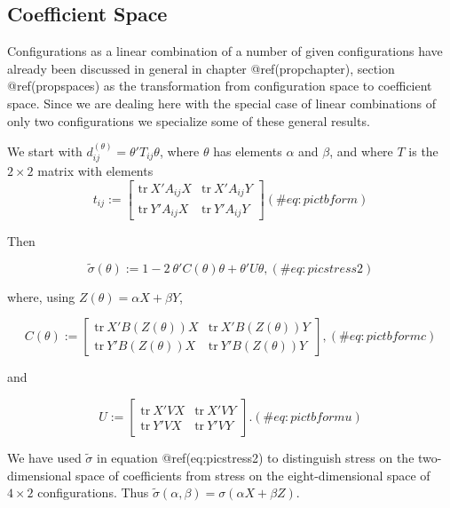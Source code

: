 \documentclass[
  12pt,
  letterpaper,
  DIV=11,
  numbers=noendperiod]{scrreprt}
\theoremstyle{remark}
\begin{document}
\subsection{Coefficient Space}\label{coefficient-space}

Configurations as a linear combination of a number of given
configurations have already been discussed in general in chapter
@ref(propchapter), section @ref(propspaces) as the transformation from
configuration space to coefficient space. Since we are dealing here with
the special case of linear combinations of only two configurations we
specialize some of these general results.

We start with \(d_{ij}^(\theta)=\theta'T_{ij}\theta\), where \(\theta\)
has elements \(\alpha\) and \(\beta\), and where \(T\) is the
\(2\times 2\) matrix with elements \begin{equation}
t_{ij}:=\begin{bmatrix}
\text{tr}\ X'A_{ij}X&\text{tr}\ X'A_{ij}Y\\
\text{tr}\ Y'A_{ij}X&\text{tr}\ Y'A_{ij}Y
\end{bmatrix}
(\#eq:pictbform)
\end{equation}

Then

\begin{equation}
\tilde\sigma(\theta):=1-2\ \theta'C(\theta)\theta+\theta'U\theta,
(\#eq:picstress2)
\end{equation}

where, using \(Z(\theta)=\alpha X+\beta Y\),

\begin{equation}
C(\theta):=
\begin{bmatrix}
\text{tr}\ X'B(Z(\theta))X&\text{tr}\ X'B(Z(\theta))Y\\
\text{tr}\ Y'B(Z(\theta))X&\text{tr}\ Y'B(Z(\theta))Y
\end{bmatrix},
(\#eq:pictbformc)
\end{equation}

and

\begin{equation}
U:=\begin{bmatrix}
\text{tr}\ X'VX&\text{tr}\ X'VY\\
\text{tr}\ Y'VX&\text{tr}\ Y'VY
\end{bmatrix}.
(\#eq:pictbformu)
\end{equation}

We have used \(\tilde\sigma\) in equation @ref(eq:picstress2) to
distinguish stress on the two-dimensional space of coefficients from
stress on the eight-dimensional space of \(4\times 2\) configurations.
Thus \(\tilde\sigma(\alpha,\beta)=\sigma(\alpha X + \beta Z)\).
\end{document}
